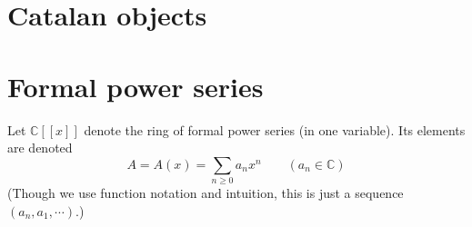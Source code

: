 \section{Catalan objects}

\section{Formal power series}
\begin{definition}
Let \(\mathbb{C}[[x]]\) denote the ring of formal power series (in one variable).
Its elements are denoted
\[ A=A(x)=\sum_{n\geq0}a_n x^n \qquad (a_n\in\mathbb{C}) \]
(Though we use function notation and intuition, this is just a sequence \((a_n,a_1,\cdots)\).)
\end{definition}